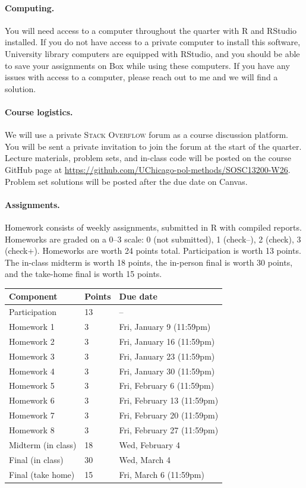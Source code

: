 \documentclass[letterpaper, 12pt, parskip=full,DIV=10]{scrartcl}
\begin{document}
\paragraph{Computing.}
You will need access to a computer throughout the quarter with R and RStudio installed.
If you do not have access to a private computer to install this software, University library computers are equipped with RStudio, and you should be able to save your assignments on Box while using these computers.
If you have any issues with access to a computer, please reach out to me and we will find a solution.

\paragraph{Course logistics.} 
We will use a private \textsc{Stack Overflow} forum as a course discussion platform. 
You will be sent a private invitation to join the forum at the start of the quarter. 
Lecture materials, problem sets, and in-class code will be posted on the course GitHub page at \url{https://github.com/UChicago-pol-methods/SOSC13200-W26}. 
Problem set solutions will be posted after the due date on Canvas. 

\paragraph{Assignments.}
Homework consists of weekly assignments, submitted in R with compiled reports.
Homeworks are graded on a 0--3 scale: 0 (not submitted), 1 (check--), 2 (check), 3 (check+).
Homeworks are worth 24 points total. Participation is worth 13 points. The in-class midterm is worth 18 points, the in-person final is worth 30 points, and the take-home final is worth 15 points.

\begin{center}
\begin{tabular}{l l l}
\textbf{Component} & \textbf{Points} & \textbf{Due date} \\
\hline
Participation & 13 & -- \\
Homework 1 & 3 & Fri, January 9 (11:59pm) \\
Homework 2 & 3 & Fri, January 16 (11:59pm) \\
Homework 3 & 3 & Fri, January 23 (11:59pm) \\
Homework 4 & 3 & Fri, January 30 (11:59pm) \\
Homework 5 & 3 & Fri, February 6 (11:59pm) \\
Homework 6 & 3 & Fri, February 13 (11:59pm) \\
Homework 7 & 3 & Fri, February 20 (11:59pm) \\
Homework 8 & 3 & Fri, February 27 (11:59pm) \\
Midterm (in class) & 18 & Wed, February 4 \\
Final (in class) & 30 & Wed, March 4 \\
Final (take home) & 15 & Fri, March 6 (11:59pm) \\
\end{tabular}
\end{center}
\end{document}
